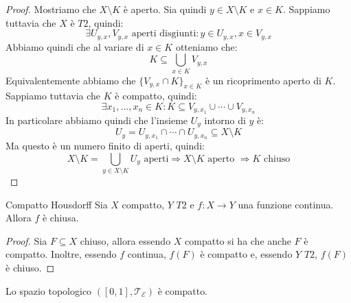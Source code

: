 \documentclass[11pt,a4paper,twoside]{article}
\theoremstyle{definition}
\begin{document}
\begin{proof}
	Mostriamo che $X \setminus K$ è aperto. Sia quindi $y \in X \setminus K$ e $x \in K$. Sappiamo tuttavia che $X$ è $T2$, quindi:
	\[ \exists U_{y,x}, V_{y,x}\text{ aperti disgiunti}: y \in U_{y,x}, x \in V_{y,x} \]
	Abbiamo quindi che al variare di $x \in K$ otteniamo che:
	\[ K \subseteq \bigcup_{x \in K}V_{y, x} \]
	Equivalentemente abbiamo che $\{ V_{y,x} \cap K \}_{x \in K}$ è un ricoprimento aperto di $K$. Sappiamo tuttavia che $K$ è compatto, quindi:
	\[\exists x_1,...,x_n \in K: K \subseteq V_{y,x_1}\cup \cdots \cup V_{y,x_n}\]
	In particolare abbiamo quindi che l'insieme $U_y$ intorno di $y$ è:
	\[ U_y = U_{y,x_1} \cap \cdots \cap U_{y,x_n} \subseteq X \setminus K \]
	Ma questo è un numero finito di aperti, quindi:
	\[ X \setminus K = \bigcup_{y \in X \setminus K}U_y \text{ aperti}\Rightarrow X \setminus K \text{ aperto } \Rightarrow K \text{ chiuso} \]
\end{proof}

\begin{thm}{Compatto Housdorff}{}
	Sia $X$ compatto, $Y$ $T2$ e $f:X \to Y$ una funzione continua. Allora $f$ è chiusa.
\end{thm}

\begin{proof}
	Sia $F \subseteq X$ chiuso, allora essendo $X$ compatto si ha che anche $F$ è compatto. Inoltre, essendo $f$ continua, $f(F)$ è compatto e, essendo $Y$ $T2$, $f(F)$ è chiuso.
\end{proof}

\begin{thm}{}{}
	Lo spazio topologico $([0,1], \mathcal T_\mathcal E)$ è compatto.
\end{thm}
\end{document}

